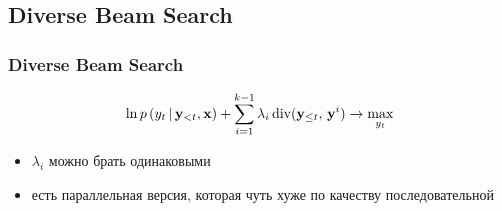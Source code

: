 \documentclass[unicode]{beamer}
\begin{document}
\subsection{Diverse Beam Search}
\begin{frame}
\frametitle{Diverse Beam Search}
$$\ln p \, (y_t \, | \, \bold{y}_{<t}, \bold{x}) + \sum_{i=1}^{k - 1} \lambda_i \, \textrm{div}(\bold{y}_{\leq t}, \, \bold{y}^i) \rightarrow \max\limits_{y_t}$$
\begin{itemize}
    \item $\lambda_i$ можно брать одинаковыми
    \item есть параллельная версия, которая чуть хуже по качеству последовательной
\end{itemize}



\end{frame}
\end{document}
